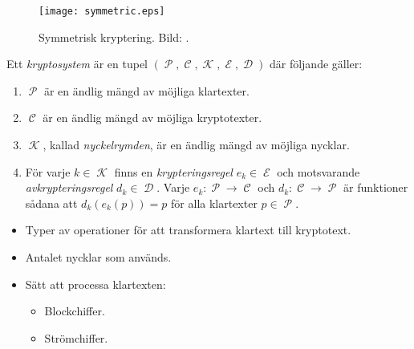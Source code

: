 \documentclass{beamer}
\theoremstyle{definition}
\DeclareMathOperator{\p}{\mathcal{P}}
\let\P\p
\DeclareMathOperator{\C}{\mathcal{C}}
\DeclareMathOperator{\K}{\mathcal{K}}
\DeclareMathOperator{\E}{\mathcal{E}}
\DeclareMathOperator{\D}{\mathcal{D}}
\let\stoch\mathbf
\renewcommand{\p}{\stoch P}
\begin{document}
\begin{frame}{\insertsubsectionhead}
  \begin{figure}
    \texttt{[image: symmetric.eps]}
    \caption{Symmetrisk kryptering.
    Bild: \cite{Stallings2011can}.}
  \end{figure}
\end{frame}

\begin{frame}{\insertsubsectionhead}
  \begin{definition}\label{def:kryptosystem}
    Ett \emph{kryptosystem} är en tupel \((\P, \C, \K, \E, \D)\) där följande 
    gäller:
    \begin{enumerate}
      \item \(\P\) är en ändlig mängd av möjliga klartexter.

      \item \(\C\) är en ändlig mängd av möjliga kryptotexter.

      \item \(\K\), kallad \emph{nyckelrymden}, är en ändlig mängd av möjliga 
        nycklar.

      \item För varje \(k\in \K\) finns en \emph{krypteringsregel} \(e_k\in 
        \E\) och motsvarande \emph{avkrypteringsregel} \(d_k\in \D\).
        Varje \(e_k\colon \P\to \C\) och \(d_k\colon \C\to \P\) är funktioner 
        sådana att \(d_k(e_k(p)) = p\) för alla klartexter \(p\in \P\).

    \end{enumerate}
  \end{definition}
\end{frame}

\begin{frame}{\insertsubsectionhead}
  \begin{itemize}
    \item Typer av operationer för att transformera klartext till kryptotext.

    \item Antalet nycklar som används.

    \item Sätt att processa klartexten:
      \begin{itemize}
        \item Blockchiffer.
        \item Strömchiffer.
      \end{itemize}

  \end{itemize}
\end{frame}
\end{document}
